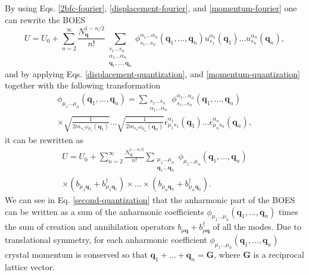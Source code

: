 By using Eqs. \ref{2bfc-fourier}, \ref{displacement-fourier}, and \ref{momentum-fourier} one can rewrite the BOES\cite{paulatto2015first}
\begin{equation}
 U = U_{0}+\sum_{n=2}^{\infty}\frac{N_{\mathbf{q}}^{1-n/2}}{n!}\sum\limits_{\substack{s_{1}\dots s_{n} \\ \alpha_{1}\dots\alpha_{n} \\ \mathbf{q}_{1},\dots,\mathbf{q}_{n}}}\phi_{s_{1}\dots s_{n}}^{
 \alpha_{1}\dots\alpha_{n}}(\mathbf{q}_{1},\dots,\mathbf{q}_{n})u_{s_{1}}^{\alpha_{1}}(\mathbf{q}_{1})\dots u_{s_{n}}^{\alpha_{n}}(\mathbf{q}_{n}),
\end{equation}
and by applying Eqs. \ref{displacement-quantization}, and \ref{momentum-quantization} together with the following transformation
\begin{multline}
 \phi_{\mu_{1}\dots\mu_{n}}(\mathbf{q}_{1},\dots,\mathbf{q}_{n})=\sum\limits_{\substack{s_{1}\dots s_{n} \\ \alpha_{1}\dots\alpha_{n}}}\phi_{s_{1}\dots s_{n}}^{\alpha_{1}\dots\alpha_{n}}(\mathbf{q}_{1},\dots,\mathbf{q}_{
 n}) \\ \times\sqrt{\frac{1}{2m_{s_{1}}\omega_{\mu_{1}}(\mathbf{q}_{1})}}\dots\sqrt{\frac{1}{2m_{s_{n}}\omega_{\mu_{n}}(\mathbf{q}_{n})}}\epsilon_{\mu_{1}s_{1}}^{\alpha_{1}}(\mathbf{q}_{1})\dots\epsilon_{\mu_{n}s_{n}}^{\alpha_{
 n}}(\mathbf{q}_{n}),
\end{multline}
it can be rewritten as
\begin{multline}
 \label{second-quantization}
 U=U_{0}+\sum_{n=2}^{\infty}\frac{N_{\mathbf{q}}^{1-n/2}}{n!}\sum\limits_{\substack{\mu_{1}\dots \mu_{n} \\ \mathbf{q}_{1}\dots\mathbf{q}_{n}}}\phi_{\mu_{1}\dots\mu_{n}}(\mathbf{q}_{1},\dots,\mathbf{
 q}_{n}) \\ \times(b_{\mu_{1}\mathbf{q}_{1}}+b^{\dagger}_{\mu_{1}\mathbf{q}_{1}})\times\dots\times(b_{\mu_{n}\mathbf{q}_{n}}+b^{\dagger}_{\mu_{n}\mathbf{q}_{n}}).
\end{multline}
We can see in Eq. \ref{second-quantization} that the anharmonic part of the BOES can be written as a sum of the anharmonic coefficients $\phi_{\mu_{1}\dots\mu_{n}}(\mathbf{q}_{1},\dots,\mathbf{ q}_{n})$ times the sum of 
creation and annihilation operators $b_{\mu\mathbf{q}}+b^{\dagger}_{\mu\mathbf{q}}$ of all the modes. Due to translational symmetry, for each anharmonic coefficient $\phi_{\mu_{1}\dots\mu_{n}}(\mathbf{q}_{1},\dots,\mathbf{ q}_{n})$
crystal momentum is conserved so that $\mathbf{q}_{1}+\dots+\mathbf{q}_{n}=\mathbf{G}$, where $\mathbf{G}$ is a reciprocal lattice vector\cite{rousseau2010giant}. \\

